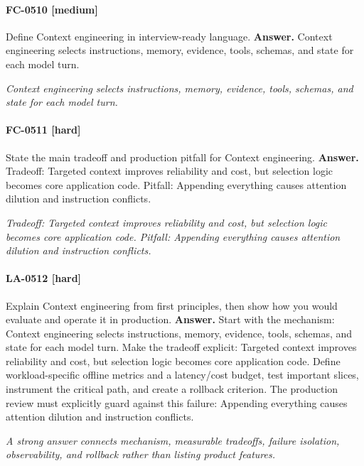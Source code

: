 \paragraph{FC-0510 [medium]} Define Context engineering in interview-ready language.
\noindent\textbf{Answer.} Context engineering selects instructions, memory, evidence, tools, schemas, and state for each model turn.
\par\textit{Context engineering selects instructions, memory, evidence, tools, schemas, and state for each model turn.}
\paragraph{FC-0511 [hard]} State the main tradeoff and production pitfall for Context engineering.
\noindent\textbf{Answer.} Tradeoff: Targeted context improves reliability and cost, but selection logic becomes core application code. Pitfall: Appending everything causes attention dilution and instruction conflicts.
\par\textit{Tradeoff: Targeted context improves reliability and cost, but selection logic becomes core application code. Pitfall: Appending everything causes attention dilution and instruction conflicts.}
\paragraph{LA-0512 [hard]} Explain Context engineering from first principles, then show how you would evaluate and operate it in production.
\noindent\textbf{Answer.} Start with the mechanism: Context engineering selects instructions, memory, evidence, tools, schemas, and state for each model turn. Make the tradeoff explicit: Targeted context improves reliability and cost, but selection logic becomes core application code. Define workload-specific offline metrics and a latency/cost budget, test important slices, instrument the critical path, and create a rollback criterion. The production review must explicitly guard against this failure: Appending everything causes attention dilution and instruction conflicts.
\par\textit{A strong answer connects mechanism, measurable tradeoffs, failure isolation, observability, and rollback rather than listing product features.}
